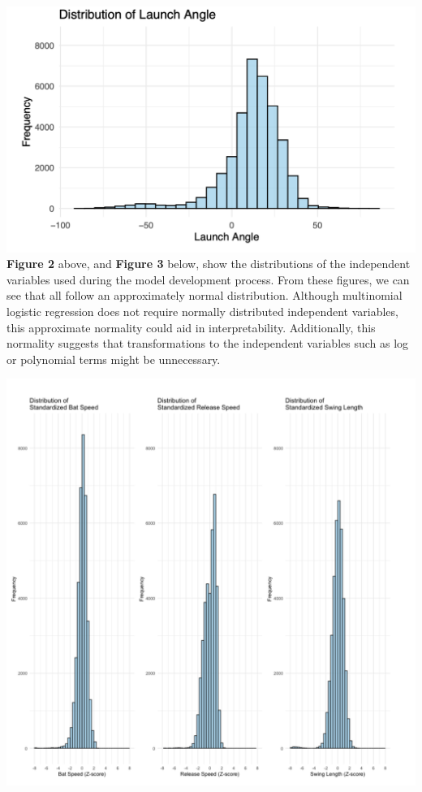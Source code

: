 \documentclass[
  letterpaper,
  DIV=11,
  numbers=noendperiod]{scrartcl}
\begin{document}
\includegraphics{./images/figures/fig2.png} \textbf{Figure 2} above, and
\textbf{Figure 3} below, show the distributions of the independent
variables used during the model development process. From these figures,
we can see that all follow an approximately normal distribution.
Although multinomial logistic regression does not require normally
distributed independent variables, this approximate normality could aid
in interpretability. Additionally, this normality suggests that
transformations to the independent variables such as log or polynomial
terms might be unnecessary.

\includegraphics{./images/figures/fig3.png} \newpage
\end{document}
